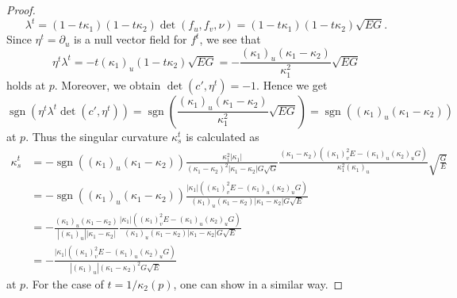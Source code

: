\documentclass[11pt,a4paper,pdflatex,final]{amsart}
\theoremstyle{plain}
\theoremstyle{definition}
\theoremstyle{remark}
\newcommand{\sgn}{\operatorname{sgn}}
\newcommand{\0}{\bm{0}}
\numberwithin{equation}{section}
\begin{document}
\begin{proof}
	\[
	\lambda^t=(1-t\kappa_1)(1-t\kappa_2)\det(f_u,f_v,\nu)
	=(1-t\kappa_1)(1-t\kappa_2)\sqrt{EG}.
	\]
	Since $\eta^t=\partial_u$ is a null vector field for $f^t$, 
	we see that 
	\[
	\eta^t\lambda^t=-t(\kappa_1)_u(1-t\kappa_2)\sqrt{EG}
	=-\frac{(\kappa_1)_u(\kappa_1-\kappa_2)}{\kappa_1^2}\sqrt{EG}
	\]
	holds at $p$. 
	Moreover, we obtain $\det(c',\eta^t)=-1$. 
	Hence we get 
	\[
	\sgn(\eta^t\lambda^t\det(c',\eta^t))
	=\sgn\left(\frac{(\kappa_1)_u(\kappa_1-\kappa_2)}{\kappa_1^2}\sqrt{EG}\right)
	=\sgn((\kappa_1)_u(\kappa_1-\kappa_2))
	\]
	at $p$. 
	Thus the singular curvature $\kappa_s^t$ is calculated as 
	\[
	\begin{aligned}
		\kappa_s^t&=-\sgn((\kappa_1)_u(\kappa_1-\kappa_2))
		\frac{\kappa_1^2|\kappa_1|}{(\kappa_1-\kappa_2)^2|\kappa_1-\kappa_2|G\sqrt{G}}
		\frac{(\kappa_1-\kappa_2)((\kappa_1)_v^2E-(\kappa_1)_u(\kappa_2)_uG)}
		{\kappa_1^2(\kappa_1)_u}\sqrt{\frac{G}{E}}\\
		&=-\sgn((\kappa_1)_u(\kappa_1-\kappa_2))
		\frac{|\kappa_1|((\kappa_1)_v^2E-(\kappa_1)_u(\kappa_2)_uG)}
		{(\kappa_1)_u(\kappa_1-\kappa_2)|\kappa_1-\kappa_2|G\sqrt{E}}\\
		&=-\frac{(\kappa_1)_u(\kappa_1-\kappa_2)}{|(\kappa_1)_u||\kappa_1-\kappa_2|}
		\frac{|\kappa_1|((\kappa_1)_v^2E-(\kappa_1)_u(\kappa_2)_uG)}
		{(\kappa_1)_u(\kappa_1-\kappa_2)|\kappa_1-\kappa_2|G\sqrt{E}}\\
		&=-\frac{|\kappa_1|((\kappa_1)_v^2E-(\kappa_1)_u(\kappa_2)_uG)}
		{|(\kappa_1)_u|(\kappa_1-\kappa_2)^2G\sqrt{E}}
	\end{aligned}
	\]
	at $p$. 
	For the case of $t=1/\kappa_2(p)$, 
	one can show in a similar way.
\end{proof}
\end{document}
